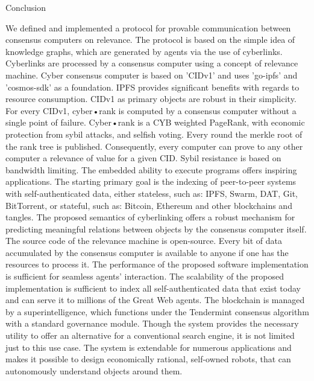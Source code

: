 \documentclass[8pt,oneside]{amsart}
\makeatletter
\renewcommand\subsection{\@startsection{subsection}
                                    {2}{\z@}
                                    {-3.25ex\@plus -1ex \@minus -.2ex}
                                    {0ex \@plus .2ex}
                                    {\play\Large}
                        }
\newcommand{\titleSection}[1]{\subsection{#1}}
\makeatother
\begin{document}
\titleSection{Conclusion}\label{Conclusion}

We defined and implemented a protocol for provable communication between consensus computers on relevance. The protocol is based on the simple idea of knowledge graphs, which are generated by agents via the use of cyberlinks. Cyberlinks are processed by a consensus computer using a concept of relevance machine. Cyber consensus computer is based on 'CIDv1' and uses 'go-ipfs' and 'cosmos-sdk' as a foundation. IPFS provides significant benefits with regards to resource consumption. CIDv1 as primary objects are robust in their simplicity. For every CIDv1, cyber•rank is computed by a consensus computer without a single point of failure. Cyber•rank is a CYB weighted PageRank, with economic protection from sybil attacks, and selfish voting. Every round the merkle root of the rank tree is published. Consequently, every computer can prove to any other computer a relevance of value for a given CID. Sybil resistance is based on bandwidth limiting. The embedded ability to execute programs offers inspiring applications. The starting primary goal is the indexing of peer-to-peer systems with self-authenticated data, either stateless, such as: IPFS, Swarm, DAT, Git, BitTorrent, or stateful, such as: Bitcoin, Ethereum and other blockchains and tangles. The proposed semantics of cyberlinking offers a robust mechanism for predicting meaningful relations between objects by the consensus computer itself. The source code of the relevance machine is open-source. Every bit of data accumulated by the consensus computer is available to anyone if one has the resources to process it. The performance of the proposed software implementation is sufficient for seamless agents' interaction. The scalability of the proposed implementation is sufficient to index all self-authenticated data that exist today and can serve it to millions of the Great Web agents. The blockchain is managed by a superintelligence, which functions under the Tendermint consensus algorithm with a standard governance module. Though the system provides the necessary utility to offer an alternative for a conventional search engine, it is not limited just to this use case. The system is extendable for numerous applications and makes it possible to design economically rational, self-owned robots, that can autonomously understand objects around them.
\end{document}
